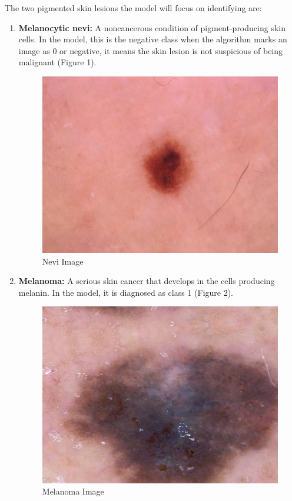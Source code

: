 \documentclass[10pt,twocolumn]{article}
\begin{document}
The two pigmented skin lesions the model will focus on identifying are:
\begin{enumerate}
    \item \textbf{Melanocytic nevi:} A noncancerous condition of pigment-producing skin cells. In the model, this is the negative class when the algorithm marks an image as 0 or negative, it means the skin lesion is not suspicious of being malignant (Figure 1).
    \begin{figure}[h]
    \caption{Nevi Image}
    \includegraphics[scale=0.4]{ISIC_0024335.jpg}\newline
    \end{figure}
    \item \textbf{Melanoma:} A serious skin cancer that develops in the cells producing melanin. In the model, it is diagnosed as class 1 (Figure 2).
    \begin{figure}[h]
    \caption{Melanoma Image}
    \includegraphics[scale=0.4]{aug_mel__10_3539.jpg}\newline
    \end{figure}
 
\end{enumerate}
\end{document}
